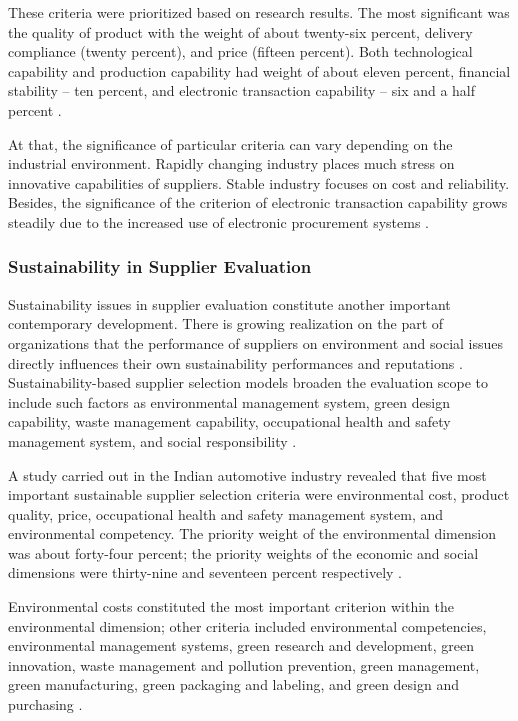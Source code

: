 \documentclass[11pt]{article}
\begin{document}
These criteria were prioritized based on research results. The most significant was the quality of product with the weight of about twenty-six percent, delivery compliance (twenty percent), and price (fifteen percent). Both technological capability and production capability had weight of about eleven percent, financial stability -- ten percent, and electronic transaction capability -- six and a half percent \cite{ref26}.

At that, the significance of particular criteria can vary depending on the industrial environment. Rapidly changing industry places much stress on innovative capabilities of suppliers. Stable industry focuses on cost and reliability. Besides, the significance of the criterion of electronic transaction capability grows steadily due to the increased use of electronic procurement systems \cite{ref26}.

\subsubsection{Sustainability in Supplier Evaluation}

Sustainability issues in supplier evaluation constitute another important contemporary development. There is growing realization on the part of organizations that the performance of suppliers on environment and social issues directly influences their own sustainability performances and reputations \cite{ref27,ref29}. Sustainability-based supplier selection models broaden the evaluation scope to include such factors as environmental management system, green design capability, waste management capability, occupational health and safety management system, and social responsibility \cite{ref27,ref30}.

A study carried out in the Indian automotive industry revealed that five most important sustainable supplier selection criteria were environmental cost, product quality, price, occupational health and safety management system, and environmental competency. The priority weight of the environmental dimension was about forty-four percent; the priority weights of the economic and social dimensions were thirty-nine and seventeen percent respectively \cite{ref27}.

Environmental costs constituted the most important criterion within the environmental dimension; other criteria included environmental competencies, environmental management systems, green research and development, green innovation, waste management and pollution prevention, green management, green manufacturing, green packaging and labeling, and green design and purchasing \cite{ref27}.
\end{document}
